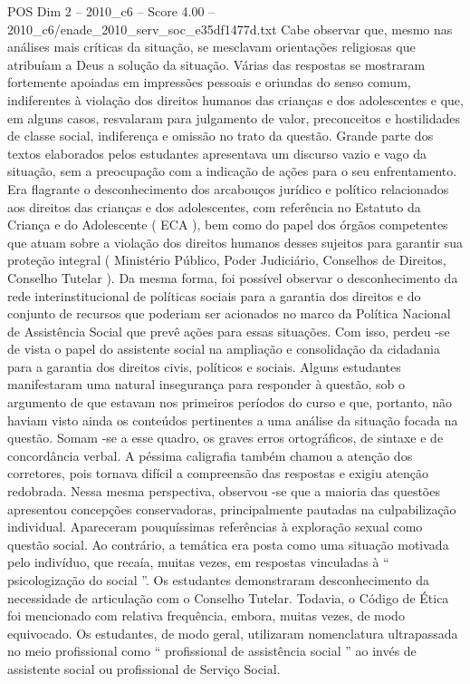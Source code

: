 \begin{textsample}{POS Dim 2 – 2010\_c6 – Score 4.00 – 2010\_c6/enade\_2010\_serv\_soc\_e35df1477d.txt}
Cabe observar que, mesmo nas análises mais críticas da situação, se mesclavam orientações religiosas que atribuíam a Deus a solução da situação.
Várias das respostas se mostraram fortemente apoiadas em impressões pessoais e oriundas do senso comum, indiferentes à violação dos direitos humanos das crianças e dos adolescentes e que, em alguns casos, resvalaram para julgamento de valor, preconceitos e hostilidades de classe social, indiferença e omissão no trato da questão.
Grande parte dos textos elaborados pelos estudantes apresentava um discurso vazio e vago da situação, sem a preocupação com a indicação de ações para o seu enfrentamento.
Era flagrante o desconhecimento dos arcabouços jurídico e político relacionados aos direitos das crianças e dos adolescentes, com referência no Estatuto da Criança e do Adolescente ( ECA ), bem como do papel dos órgãos competentes que atuam sobre a violação dos direitos humanos desses sujeitos para garantir sua proteção integral ( Ministério Público, Poder Judiciário, Conselhos de Direitos, Conselho Tutelar ).
Da mesma forma, foi possível observar o desconhecimento da rede interinstitucional de políticas sociais para a garantia dos direitos e do conjunto de recursos que poderiam ser acionados no marco da Política Nacional de Assistência Social que prevê ações para essas situações.
Com isso, perdeu -se de vista o papel do assistente social na ampliação e consolidação da cidadania para a garantia dos direitos civis, políticos e sociais.
Alguns estudantes manifestaram uma natural insegurança para responder à questão, sob o argumento de que estavam nos primeiros períodos do curso e que, portanto, não haviam visto ainda os conteúdos pertinentes a uma análise da situação focada na questão.
Somam -se a esse quadro, os graves erros ortográficos, de sintaxe e de concordância verbal.
A péssima caligrafia também chamou a atenção dos corretores, pois tornava difícil a compreensão das respostas e exigiu atenção redobrada.
Nessa mesma perspectiva, observou -se que a maioria das questões apresentou concepções conservadoras, principalmente pautadas na culpabilização individual.
Apareceram pouquíssimas referências à exploração sexual como questão social.
Ao contrário, a temática era posta como uma situação motivada pelo indivíduo, que recaía, muitas vezes, em respostas vinculadas à “ psicologização do social ”.
Os estudantes demonstraram desconhecimento da necessidade de articulação com o Conselho Tutelar.
Todavia, o Código de Ética foi mencionado com relativa frequência, embora, muitas vezes, de modo equivocado.
Os estudantes, de modo geral, utilizaram nomenclatura ultrapassada no meio profissional como “ profissional de assistência social ” ao invés de assistente social ou profissional de Serviço Social.

\end{textsample}
